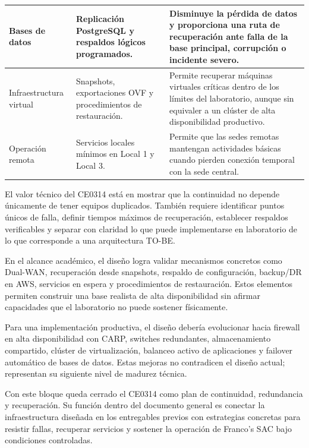 \documentclass[11pt, a4paper, oneside]{report}
\begin{document}
\begin{xltabular}{\textwidth}{@{}|L{3.3cm}|X|X|@{}}
{\small Bases de datos} &
{\small Replicación PostgreSQL y respaldos lógicos programados.} &
{\small Disminuye la pérdida de datos y proporciona una ruta de recuperación ante falla de la base principal, corrupción o incidente severo.} \\ \hline

{\small Infraestructura virtual} &
{\small Snapshots, exportaciones OVF y procedimientos de restauración.} &
{\small Permite recuperar máquinas virtuales críticas dentro de los límites del laboratorio, aunque sin equivaler a un clúster de alta disponibilidad productivo.} \\ \hline

{\small Operación remota} &
{\small Servicios locales mínimos en Local 1 y Local 3.} &
{\small Permite que las sedes remotas mantengan actividades básicas cuando pierden conexión temporal con la sede central.} \\ \hline

\end{xltabular}

\normalsize

El valor técnico del CE0314 está en mostrar que la continuidad no depende únicamente de tener equipos duplicados. También requiere identificar puntos únicos de falla, definir tiempos máximos de recuperación, establecer respaldos verificables y separar con claridad lo que puede implementarse en laboratorio de lo que corresponde a una arquitectura TO-BE.

En el alcance académico, el diseño logra validar mecanismos concretos como Dual-WAN, recuperación desde snapshots, respaldo de configuración, backup/DR en AWS, servicios en espera y procedimientos de restauración. Estos elementos permiten construir una base realista de alta disponibilidad sin afirmar capacidades que el laboratorio no puede sostener físicamente.

Para una implementación productiva, el diseño debería evolucionar hacia firewall en alta disponibilidad con CARP, switches redundantes, almacenamiento compartido, clúster de virtualización, balanceo activo de aplicaciones y failover automático de bases de datos. Estas mejoras no contradicen el diseño actual; representan su siguiente nivel de madurez técnica.

Con este bloque queda cerrado el CE0314 como plan de continuidad, redundancia y recuperación. Su función dentro del documento general es conectar la infraestructura diseñada en los entregables previos con estrategias concretas para resistir fallas, recuperar servicios y sostener la operación de Franco's SAC bajo condiciones controladas.
\end{document}

